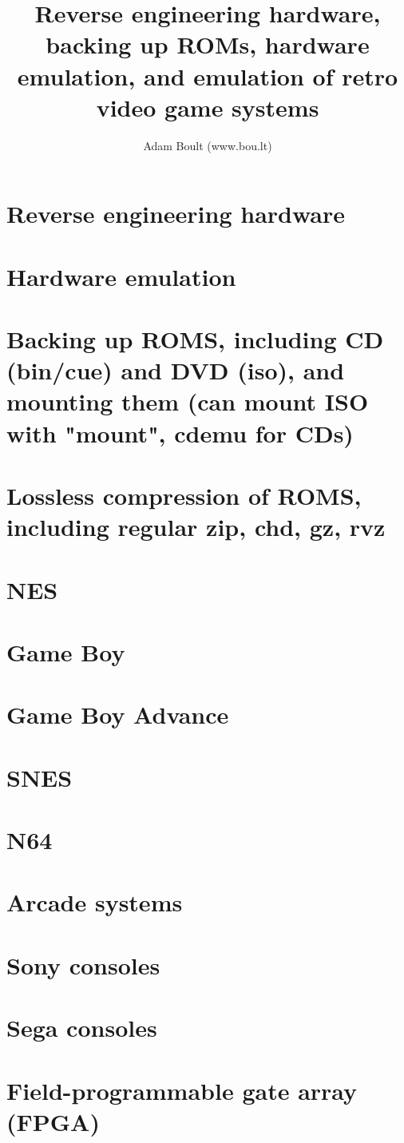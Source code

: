 \documentclass[oneside]{book}
\begin{document}
\author{Adam Boult (www.bou.lt)}
\title{Reverse engineering hardware, backing up ROMs, hardware emulation, and emulation of retro video game systems}
\maketitle

\setcounter{tocdepth}{0}
\tableofcontents



\part{Reverse engineering hardware}

\part{Hardware emulation}


\part{Backing up ROMS, including CD (bin/cue) and DVD (iso), and mounting them (can mount ISO with "mount", cdemu for CDs)}

\part{Lossless compression of ROMS, including regular zip, chd, gz, rvz}

\part{NES}

\part{Game Boy}

\part{Game Boy Advance}

\part{SNES}

\part{N64}

\part{Arcade systems}

\part{Sony consoles}

\part{Sega consoles}

\part{Field-programmable gate array (FPGA)}
\end{document}
